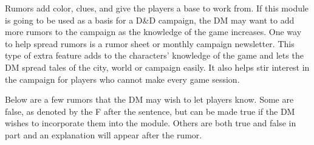 \documentclass[palace_of_the_silver_princess]{subfiles}
\begin{document}
Rumors add color, clues, and give the players a base to work from. If
this module is going to be used as a basis for a D\&D campaign, the DM
may want to add more rumors to the campaign as the knowledge of the game
increases. One way to help spread rumors is a rumor sheet or monthly
campaign newsletter. This type of extra feature adds to the characters’
knowledge of the game and lets the DM spread tales of the city, world or
campaign easily. It also helps stir interest in the campaign for players
who cannot make every game session.

Below are a few rumors that the DM may wish to let players know. Some
are false, as denoted by the F after the sentence, but can be made true
if the DM wishes to incorporate them into the module. Others are both
true and false in part and an explanation will appear after the rumor.
\end{document}
